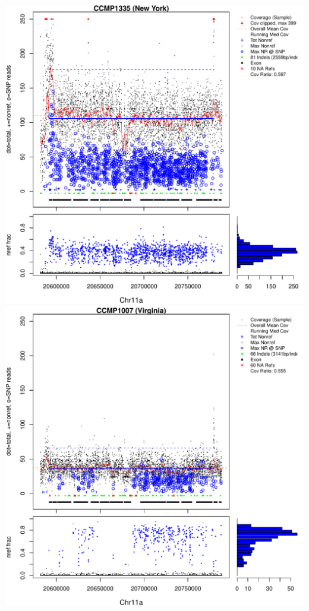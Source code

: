 \documentclass{article}\usepackage[]{graphicx}\usepackage[]{color}
\makeatletter
\def\maxwidth{ %
  \ifdim\Gin@nat@width>\linewidth
    \linewidth
  \else
    \Gin@nat@width
  \fi
}
\newenvironment{knitrout}{}{} %
\makeatother
\begin{document}
\begin{knitrout}
{\centering \includegraphics[width=\maxwidth]{figs-knitr/unnamed-chunk-50-1} 
\includegraphics[width=\maxwidth]{figs-knitr/unnamed-chunk-50-2} 
}
\end{knitrout}
\end{document}
